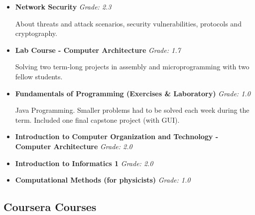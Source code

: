 \documentclass[11pt,a4paper,sans]{moderncv}        %
\begin{document}
\begin{itemize}
\item{\textbf{Network Security} \textit{Grade: 2.3}

\vspace{2pt}
\small{About threats and attack scenarios, security vulnerabilities, protocols and cryptography.}}

\vspace{2pt}

\item{\textbf{Lab Course - Computer Architecture} \textit{Grade: 1.7}

\vspace{2pt}

\small{Solving two term-long projects in assembly and microprogramming with two fellow students.}}

\item{\textbf{Fundamentals of Programming (Exercises \& Laboratory)} \textit{Grade: 1.0}

\vspace{2pt}
\small{Java Programming. Smaller problems had to be solved each week during the term. Included one final capstone project (with GUI).}}

\item{\textbf{Introduction to Computer Organization and Technology - Computer Architecture} \textit{Grade: 2.0}}

\item{\textbf{Introduction to Informatics 1} \textit{Grade: 2.0}}

\item{\textbf{Computational Methods (for physicists)} \textit{Grade: 1.0}}

\end{itemize}

\subsection{Coursera Courses}

\vspace{5pt}
\end{document}
